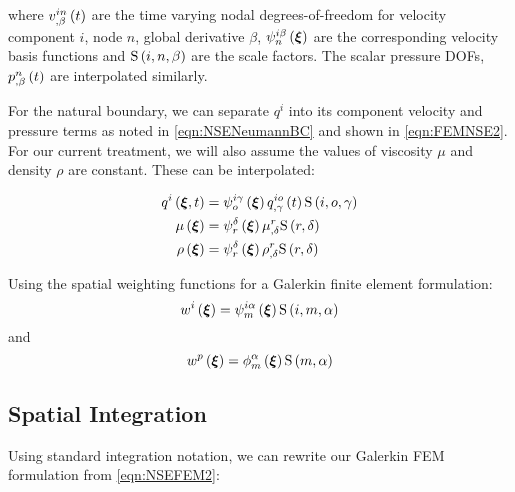 where $\fnof{\idxnodedof{v}{i}{n}{\beta}}{t}$ are the time varying nodal
degrees-of-freedom for velocity component $i$, node $n$, global derivative
$\beta$, $\idxgbfn{i}{n}{\beta}{\vectr{\xi}}$ are the corresponding velocity
basis functions and $\idxgsf{i}{n}{\beta}$ are the scale factors. The scalar
pressure DOFs, $\fnof{\nodedof{p}{n}{\beta}}{t}$ are interpolated
similarly.

For the natural boundary, we can separate $q^{i}$ into its component velocity
and pressure terms as noted in \ref{eqn:NSENeumannBC} and shown in
\ref{eqn:FEMNSE2}. For our current treatment, we will also assume the values
of viscosity $\mu$ and density $\rho$ are constant. These can be interpolated:

\begin{equation}
  \begin{split}
    \fnof{q^{i}}{\vectr{\xi},t} &= \idxgbfn{i}{o}{\gamma}{\vectr{\xi}}
      \fnof{\idxnodedof{q}{i}{o}{\gamma}}{t}\idxgsf{i}{o}{\gamma} \\
    \fnof{\mu}{\vectr{\xi}} &=\gbfn{r}{\delta}{\vectr{\xi}}
    \nodedof{\mu}{r}{\delta}\gsf{r}{\delta} \\
    \fnof{\rho}{\vectr{\xi}} &=\gbfn{r}{\delta}{\vectr{\xi}}\nodedof{\rho}{r}{\delta}
    \gsf{r}{\delta} \\
  \end{split}
\end{equation}

Using the spatial weighting functions for a Galerkin finite element
formulation:
\begin{equation}
  \fnof{w^{i}}{\vectr{\xi}}=\idxgbfn{i}{m}{\alpha}{\vectr{\xi}}\idxgsf{i}{m}{\alpha}
\end{equation}
and
\begin{equation}
  \fnof{w^{p}}{\vectr{\xi}}=\altgbfn{m}{\alpha}{\vectr{\xi}}\gsf{m}{\alpha}
\end{equation}


\subsection{Spatial Integration}

Using standard integration notation, we can rewrite our Galerkin FEM
formulation from \ref{eqn:NSEFEM2}:

